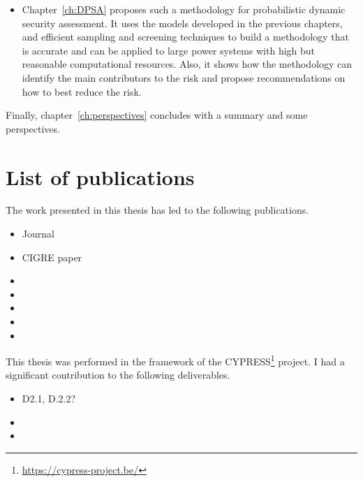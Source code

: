 \begin{itemize}
    \item Chapter~\ref{ch:DPSA} proposes such a methodology for probabilistic dynamic security assessment. It uses the models developed in the previous chapters, and efficient sampling and screening techniques to build a methodology that is accurate and can be applied to large power systems with high but reasonable computational resources. Also, it shows how the methodology can identify the main contributors to the risk and propose recommendations on how to best reduce the risk.
\end{itemize}

Finally, chapter~\ref{ch:perspectives} concludes with a summary and some perspectives.

\section{List of publications}

The work presented in this thesis has led to the following publications.

\begin{itemize}
    \item Journal
    \item CIGRE paper
    \item {}
    \item {}
    \item {}
    \item {}
    \item {}
\end{itemize}


This thesis was performed in the framework of the CYPRESS\footnote{\url{https://cypress-project.be/}} project. I had a significant contribution to the following deliverables.

\begin{itemize}
    \item D2.1, D.2.2?
    \item {}
    \item {}
\end{itemize}
